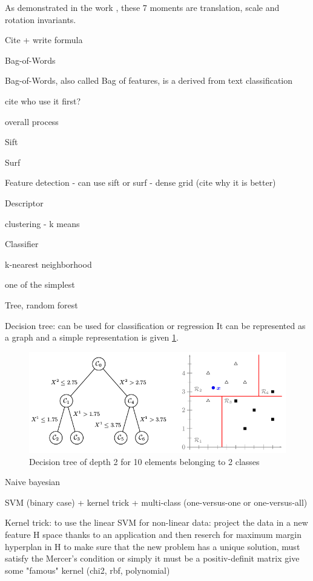 As demonstrated in the work \cite{Hu1962}, these 7 moments are translation, scale and rotation invariants.

Cite + write formula

Bag-of-Words

Bag-of-Words, also called Bag of features, is a 
derived from text classification

cite who use it first?

overall process

Sift

Surf

Feature detection
- can use sift or surf
- dense grid (cite why it is better)

Descriptor

clustering
- k means

Classifier

k-nearest neighborhood

one of the simplest

Tree, random forest

Decision tree: can be used for classification or regression
It can be represented as a graph and a simple representation is given \ref{fig:decision_tree_simple_example}.

\begin{figure}[h]
    \includegraphics[scale=0.5]{img/decision_tree_simple_example}
    \caption{Decision tree of depth 2 for 10 elements belonging to 2 classes}
    \label{fig:decision_tree_simple_example}
\end{figure}


Naive bayesian

SVM (binary case) + kernel trick + multi-class (one-versus-one or one-versus-all)

Kernel trick:
to use the linear SVM for non-linear data: project the data in a new feature H space thanks to an application and then reserch for maximum margin hyperplan in H
to make sure that the new problem has a unique solution, 
must satisfy the Mercer's condition or simply it must be a positiv-definit matrix
give some "famous" kernel (chi2, rbf, polynomial)

